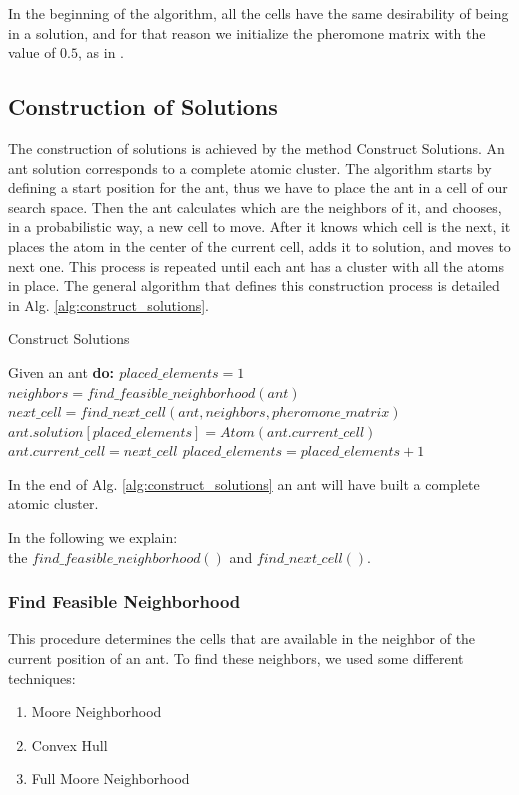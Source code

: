 	In the beginning of the algorithm, all the cells have the same desirability of being in a solution, and for that reason we initialize the pheromone matrix with the value of $0.5$, as in \cite{blum04}.
	
	
	\subsection{Construction of Solutions}
	The construction of solutions is achieved by the method Construct Solutions. An ant solution corresponds to a complete atomic cluster. The algorithm starts by defining a start position for the ant, thus we have to place the ant in a cell of our search space. Then the ant calculates which are the neighbors of it, and chooses, in a probabilistic way, a new cell to move. After it knows which cell is the next, it places the atom in the center of the current cell, adds it to solution, and moves to next one. This process is repeated until each ant has a cluster with all the atoms in place. The general algorithm that defines this construction process is detailed in Alg. \ref{alg:construct_solutions}.
	
	\begin{algorithm}
		\caption{Construct Solutions}
		\label{alg:construct_solutions}
		\begin{algorithmic}
		\STATE Given an ant \bf{do}:
		\STATE $placed\_elements = 1$
			\STATE $neighbors = find\_feasible\_neighborhood(ant)$
			\STATE $next\_cell = find\_next\_cell(ant, neighbors, pheromone\_matrix)$
			\STATE $ant.solution[placed\_elements] = Atom(ant.current\_cell)$
			\STATE $ant.current\_cell = next\_cell$
			\STATE $placed\_elements = placed\_elements + 1$			
		\ENDWHILE
		\end{algorithmic}
	\end{algorithm}
	
	In the end of Alg. \ref{alg:construct_solutions} an ant will have built a complete atomic cluster.
	
	In the following we explain:\\ the $find\_feasible\_neighborhood()$ and $find\_next\_cell()$. 
	
		\subsubsection*{Find Feasible Neighborhood}
		This procedure determines the cells that are available in the neighbor of the current position of an ant. To find these neighbors, we used some different techniques:
		\begin{enumerate}
			\item Moore Neighborhood
			\item Convex Hull
			\item Full Moore Neighborhood
		\end{enumerate}
	
